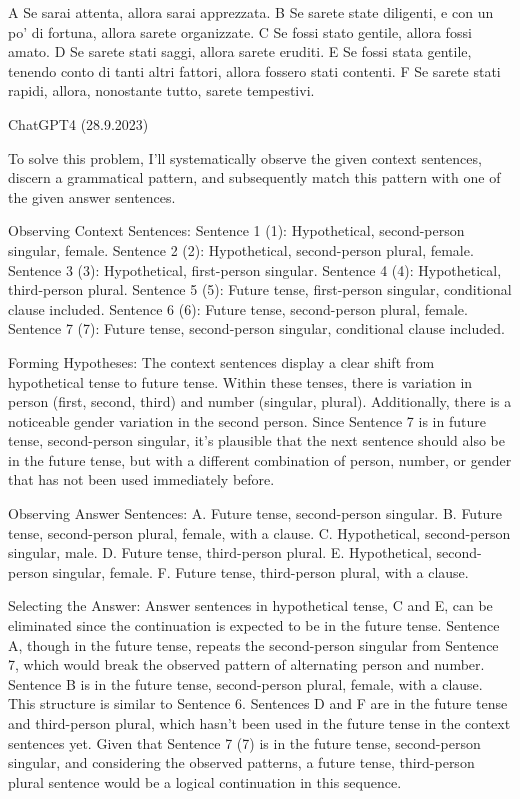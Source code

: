 A Se sarai attenta, allora sarai apprezzata.
B Se sarete state diligenti, e con un po' di fortuna, allora sarete organizzate.
C Se fossi stato gentile, allora fossi amato.
D Se sarete stati saggi, allora sarete eruditi.
E Se fossi stata gentile, tenendo conto di tanti altri fattori, allora fossero stati contenti.
F Se sarete stati rapidi, allora, nonostante tutto, sarete tempestivi.

ChatGPT4 (28.9.2023)

To solve this problem, I'll systematically observe the given context sentences, discern a grammatical pattern, and subsequently match this pattern with one of the given answer sentences.

Observing Context Sentences:
Sentence 1 (1): Hypothetical, second-person singular, female.
Sentence 2 (2): Hypothetical, second-person plural, female.
Sentence 3 (3): Hypothetical, first-person singular.
Sentence 4 (4): Hypothetical, third-person plural.
Sentence 5 (5): Future tense, first-person singular, conditional clause included.
Sentence 6 (6): Future tense, second-person plural, female.
Sentence 7 (7): Future tense, second-person singular, conditional clause included.

Forming Hypotheses:
The context sentences display a clear shift from hypothetical tense to future tense.
Within these tenses, there is variation in person (first, second, third) and number (singular, plural).
Additionally, there is a noticeable gender variation in the second person.
Since Sentence 7 is in future tense, second-person singular, it's plausible that the next sentence should also be in the future tense, but with a different combination of person, number, or gender that has not been used immediately before.

Observing Answer Sentences:
A. Future tense, second-person singular.
B. Future tense, second-person plural, female, with a clause.
C. Hypothetical, second-person singular, male.
D. Future tense, third-person plural.
E. Hypothetical, second-person singular, female.
F. Future tense, third-person plural, with a clause.

Selecting the Answer:
Answer sentences in hypothetical tense, C and E, can be eliminated since the continuation is expected to be in the future tense.
Sentence A, though in the future tense, repeats the second-person singular from Sentence 7, which would break the observed pattern of alternating person and number.
Sentence B is in the future tense, second-person plural, female, with a clause. This structure is similar to Sentence 6.
Sentences D and F are in the future tense and third-person plural, which hasn't been used in the future tense in the context sentences yet.
Given that Sentence 7 (7) is in the future tense, second-person singular, and considering the observed patterns, a future tense, third-person plural sentence would be a logical continuation in this sequence.

